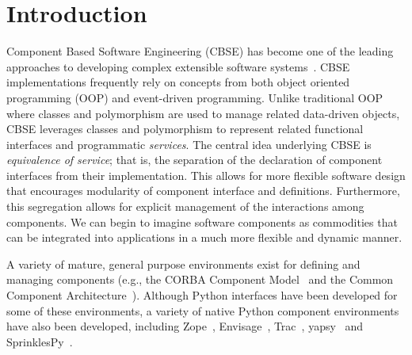 
\section{Introduction}

Component Based Software Engineering (CBSE) has become one of the
leading approaches to developing complex extensible software
systems~\cite{HeiCou01}.  CBSE implementations frequently rely on
concepts from both object oriented programming (OOP) and event-driven
programming.  Unlike traditional OOP where classes and polymorphism
are used to manage related data-driven objects, CBSE leverages
classes and polymorphism to represent related functional interfaces
and programmatic \emph{services}.  The central idea underlying CBSE
is \emph{equivalence of service}; that is, the separation of the
declaration of component interfaces from their implementation.  This
allows for more flexible software design that encourages modularity
of component interface and definitions.  Furthermore, this segregation
allows for explicit management of the interactions among components.
We can begin to imagine software components as commodities that can
be integrated into applications in a much more flexible and dynamic
manner.

A variety of mature, general purpose environments exist
for defining and managing components (e.g., the CORBA Component
Model~\cite{CORBA_CMS} and the Common Component
Architecture~\cite{cca}).  Although 
Python interfaces have been developed for some of these environments, a
variety of native Python component environments have also been developed,
including Zope~\cite{Zope}, Envisage~\cite{Envisage}, Trac~\cite{Trac},
yapsy~\cite{yapsy} and SprinklesPy~\cite{SprinklesPy}.

